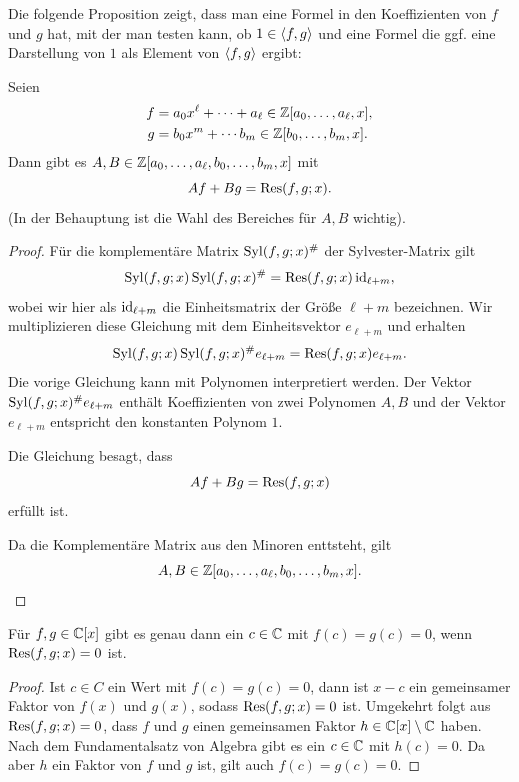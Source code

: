\documentclass[11pt]{article}
\numberwithin{equation}{section}
\begin{document}
Die folgende Proposition zeigt, dass man eine Formel in den Koeffizienten von $f$ und $g$ hat, mit der man testen kann, ob $1 \in \left< f,g \right>$ und eine Formel die ggf. eine Darstellung von $1$ als Element von $\left< f,g \right>$ ergibt: 
\begin{proposition} 
	Seien 
	\begin{align*} 
		f & = a_0 x^\ell + \cdots + a_\ell \in \mathbb{Z}[a_0,\ldots,a_\ell,x],
	\\	g &  = b_0 x^m + \cdots b_m \in \mathbb{Z}[b_0,\ldots,b_m,x]. 
	\end{align*}
	Dann gibt es $A,B \in \mathbb{Z}[a_0,\ldots,a_\ell,b_0,\ldots,b_m,x]$ mit 
	\[
		A f + B g = \operatorname{Res}(f,g;x). 
	\]
	(In der Behauptung  ist die Wahl des Bereiches für $A,B$ wichtig). 
\end{proposition} 
\begin{proof}
	Für die komplementäre Matrix $\operatorname{Syl}(f,g;x)^{\#}$ der Sylvester-Matrix gilt
	\[
		\operatorname{Syl}(f,g;x) \operatorname{Syl}(f,g;x)^{\#} = \operatorname{Res}(f,g;x) \operatorname{id}_{\ell+m},
	\] 
	wobei wir hier als $\operatorname{id}_{\ell+m}$ die Einheitsmatrix der Größe $\ell+m$ bezeichnen. Wir multiplizieren diese Gleichung mit dem Einheitsvektor $e_{\ell+m}$ und erhalten 
	\[
		\operatorname{Syl}(f,g;x) \operatorname{Syl}(f,g;x)^{\#} e_{\ell+m} = \operatorname{Res}(f,g;x) e_{\ell+m}. 
	\]
	Die vorige Gleichung kann mit Polynomen interpretiert werden. Der Vektor $\operatorname{Syl}(f,g;x)^{\#} e_{\ell+m}$ enthält Koeffizienten von zwei Polynomen $A, B$ und der Vektor $e_{\ell+m}$ entspricht den konstanten Polynom $1$. 
	
	Die Gleichung besagt, dass 
	\[
		A f + B g = \operatorname{Res}(f,g;x)
	\]
	erfüllt ist. 
	
	Da die Komplementäre  Matrix aus den Minoren enttsteht, gilt 
	\[
		A,B \in \mathbb{Z}[a_0,\ldots,a_\ell,b_0,\ldots,b_m,x].
	\]
\end{proof} 

\begin{proposition}
	Für $f,g \in \mathbb{C}[x]$ gibt es genau dann ein $c \in \mathbb{C}$ mit $f(c) = g(c) =0$, wenn $\operatorname{Res}(f,g;x) = 0$ ist. 
\end{proposition} 
\begin{proof} 
	Ist $c \in C$ ein Wert mit $f(c) = g(c) =0$, dann ist $x-c$ ein gemeinsamer Faktor von $f(x)$ und $g(x)$, sodass $\operatorname{Res}(f,g;x)=0$ ist. Umgekehrt folgt aus $\operatorname{Res}(f,g;x)=0$, dass $f$ und $g$ einen gemeinsamen Faktor $h \in \mathbb{C}[x] \setminus \mathbb{C}$ haben. Nach dem Fundamentalsatz von Algebra gibt es ein $c \in \mathbb{C}$ mit $h(c) =0$. Da aber $h$ ein Faktor von $f$ und $g$ ist, gilt auch $f(c)=g(c)=0$. 
\end{proof} 
\end{document}
